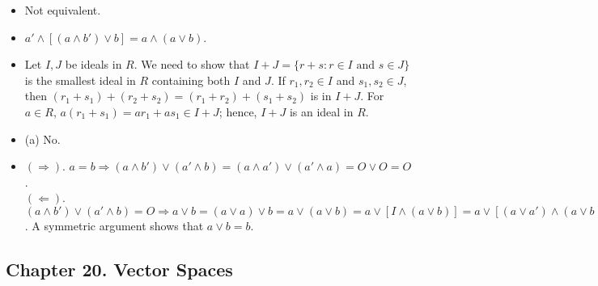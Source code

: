 {\begin{itemize}
\begin{center}
\end{center}
 
 
 
 
\item[8.]
Not equivalent.
 
\item[10.]
$a' \wedge [(a \wedge b') \vee b] = a \wedge (a \vee b)$.

\item[15.]
Let $I, J$ be ideals in $R$. We need to show that $I + J 
= \{ r + s : r \in
I \mbox{ and } s \in J  \}$ is the smallest ideal in $R$ containing
both $I$ and $J$. If $r_1, r_2 \in I$ and $s_1, s_2 \in J$, then
$(r_1 + s_1) + (r_2 + s_2) = (r_1 + r_2) +(s_1 + s_2)$ is in $I + J$.
For $a \in R$, $a(r_1 + s_1) = ar_1 + as_1 \in I + J$; hence, $I + J$
is an ideal in $R$.


\item[19.]
(a) No.

\item[21.]
$( \Rightarrow)$. $a = b \Rightarrow (a \wedge b') \vee (a' \wedge b)
= (a \wedge a') \vee (a' \wedge a) = O \vee O = O$. \\
$( \Leftarrow)$. $( a \wedge b') \vee (	a' \wedge b) = O \Rightarrow
a \vee b = (a \vee a) \vee b = a \vee (a \vee b) = a \vee [I \wedge
(a \vee b)] = a \vee [(a \vee a') \wedge (a \vee b)] = [a \vee
(a \wedge b')] \vee [a \vee (a' \wedge b)] = a \vee [(a \wedge b') \vee
(a' \wedge b)] = a \vee 0 = a$.  A symmetric argument shows that $a
\vee b = b$.



 
\end{itemize}
}
 
\subsection*{Chapter 20. Vector Spaces}
 

